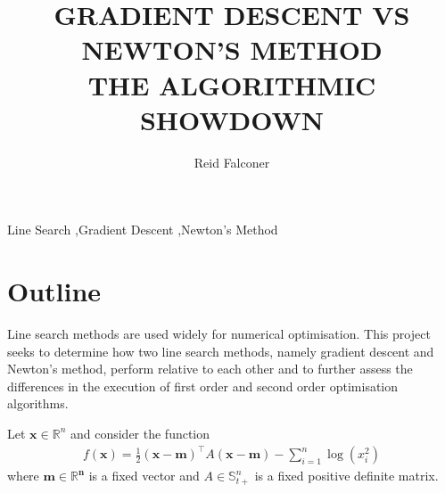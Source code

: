 \documentclass[12pt, authoryear]{elsarticle}
\begin{document}
\begin{frontmatter}  %

\title{ GRADIENT DESCENT VS NEWTON'S METHOD \\ \vspace{0.5cm} \large 
 THE ALGORITHMIC SHOWDOWN
}

\author[Add1]{Reid Falconer}

\address[Add1]{Barcelona Graduate School of Economics, Barcelona, Spain}




\begin{keyword}
\footnotesize{
Line Search \sep  Gradient Descent \sep Newton's Method \\ \vspace{0.3cm}
}
\end{keyword}
\vspace{0.5cm}
\end{frontmatter}

\headsep 25pt %

\section{Outline}

Line search methods are used widely for numerical optimisation. This project seeks to determine how two line search methods, namely gradient descent and Newton's method, perform relative to each other and to further assess the differences in the execution of first order and second order optimisation algorithms.

Let $\boldsymbol { x } \in \mathbb { R } ^ { n }$ and consider the function
\begin{equation}
\begin{aligned}
f ( \boldsymbol{ x} ) = \frac { 1 } { 2 } ( \boldsymbol{ x}  - \boldsymbol{ m}  ) ^ { \top } A ( \boldsymbol{ x}  - \boldsymbol{ m}  ) - \sum _ { i = 1 } ^ { n } \log \left( x _ { i } ^ { 2 } \right)
\label{function}
\end{aligned}
\end{equation}
where $\boldsymbol { m } \in \mathbb { R } ^ { \mathbf { n } }$ is a fixed vector and $A \in \mathbb { S } _ { t + } ^ { n }$ is a fixed positive definite matrix.
\end{document}
